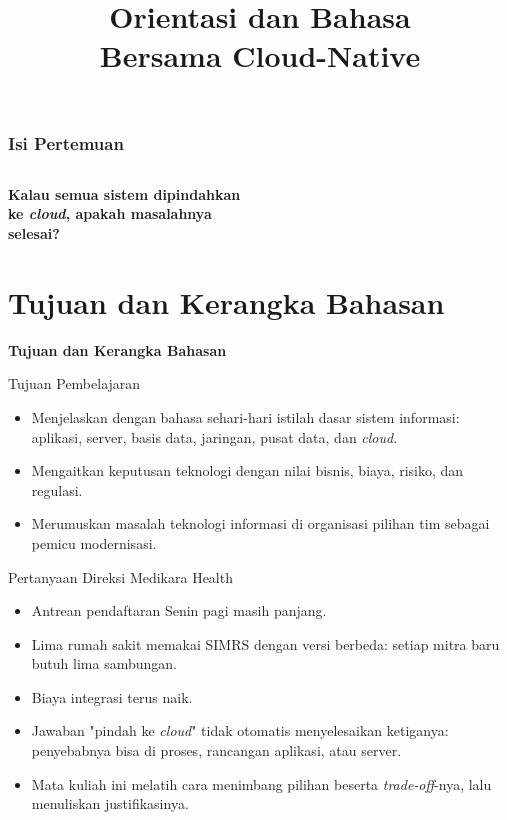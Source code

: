 \documentclass[aspectratio=169, table, 12pt]{beamer}
\title{\Huge Orientasi dan Bahasa\\ \vspace{10pt} Bersama Cloud-Native}
\begin{document}
\frame{\titlepage}

\begin{frame}
  \frametitle{Isi Pertemuan}
  \vspace{10pt}
  \begin{columns}[t]
    {\small\tableofcontents[sections={1-4}]}

    {\small\tableofcontents[sections={5-8}]}
  \end{columns}
\end{frame}

\begin{frame}{\hfill}
  \centering
  \LARGE{\textbf{Kalau semua sistem dipindahkan\\ke \textit{cloud}, apakah
  masalahnya\\selesai?}}
\end{frame}

\section{Tujuan dan Kerangka Bahasan}

\begin{frame}{\hfill}
  \centering
  \Huge{\textbf{Tujuan dan Kerangka Bahasan}}
\end{frame}

\begin{frame}{Tujuan Pembelajaran}
  \vspace{6pt}
  \begin{itemize}
    \item Menjelaskan dengan bahasa sehari-hari istilah dasar sistem informasi:
          aplikasi, server, basis data, jaringan, pusat data, dan \textit{cloud}.
    \item Mengaitkan keputusan teknologi dengan nilai bisnis, biaya, risiko, dan
          regulasi.
    \item Merumuskan masalah teknologi informasi di organisasi pilihan tim sebagai
          pemicu modernisasi.
  \end{itemize}
\end{frame}

\begin{frame}{Pertanyaan Direksi Medikara Health}
  \begin{itemize}
    \item Antrean pendaftaran Senin pagi masih panjang.
    \item Lima rumah sakit memakai SIMRS dengan versi berbeda: setiap mitra baru
          butuh lima sambungan.
    \item Biaya integrasi terus naik.
    \item Jawaban "pindah ke \textit{cloud}" tidak otomatis menyelesaikan ketiganya:
          penyebabnya bisa di proses, rancangan aplikasi, atau server.
    \item Mata kuliah ini melatih cara menimbang pilihan beserta
          \textit{trade-off}-nya, lalu menuliskan justifikasinya.
  \end{itemize}
\end{frame}
\end{document}
